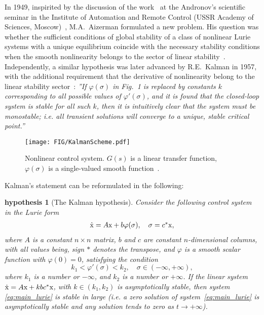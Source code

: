 \documentclass{ifacconf}
\theoremstyle{plain}
\newtheorem{hypothesis}{hypothesis}
\begin{document}
In 1949, inspirited by the discussion of the work~\citep{AndronovM-1944}
at the Andronov's scientific seminar in the Institute of Automation and Remote Control
(USSR Academy of Sciences, Moscow)~\citep{Bissell-1998},
M.A.~Aizerman formulated a new problem.
His question was whether
the sufficient conditions of global stability of
a class of nonlinear Lurie systems with a unique equilibrium
coincide with the necessary stability conditions
when the smooth nonlinearity belongs to the sector of linear stability~\citep{Aizerman-1949}.
Independently, a similar hypothesis was later advanced by R.E.~Kalman in 1957,
with the additional requirement that the derivative of nonlinearity
belong to the linear stability sector~\citep{Kalman-1957}:
\emph{''If $\varphi(\sigma)$ in Fig.~1
is replaced by constants
$k$ corresponding to all possible values of $\varphi'(\sigma)$, and
it is found that the closed-loop system is stable for
all such $k$, then it is intuitively clear that the system
must be monostable; i.e. all transient solutions
will converge to a unique, stable critical point.''}
\begin{figure}[ht]
  \centering
  \texttt{[image: FIG/KalmanScheme.pdf]}
  \caption{Nonlinear control system. $G(s)$ is a linear transfer
  function, $\varphi(\sigma)$ is a single-valued smooth function~\citep{Kalman-1957}.}
  \label{fig:kalman_scheme}
\end{figure}

Kalman's statement can be reformulated in the
following:
\begin{hypothesis}[The Kalman hypothesis]
  Consider the following control system in the Lurie form
  \begin{equation}\label{eq:main_lurie}
    \begin{array}{l}
    \dot{{\rm x}} = A {\rm x} + b \varphi(\sigma),\quad \sigma = c^{*}{\rm x},
    \end{array}
  \end{equation}
  where $A$ is a constant $n \times n$ matrix, $b$ and $c$ are constant
  $n$-dimensional columns, with all values being, sign $*$
  denotes the transpose, and $\varphi$ is a smooth scalar function with $\varphi(0) = 0$,
  satisfying the condition
  \begin{equation}\label{cond:kalman}
    k_1 < \varphi'(\sigma) < k_2, \quad \sigma \in (-\infty,+\infty),
  \end{equation}
  where $k_1$ is a number or $-\infty$, and $k_2$ is a number or $+\infty$.
  If the linear system $\dot{{\rm x}} = A {\rm x} + k b c^* {\rm x}$, with $k \in (k_1, k_2)$
  is asymptotically stable, then system \eqref{eq:main_lurie}
  is stable in large (i.e. a zero solution of system~\eqref{eq:main_lurie} is asymptotically stable
  and any solution tends to zero as $t \to +\infty$).
\end{hypothesis}
\end{document}
